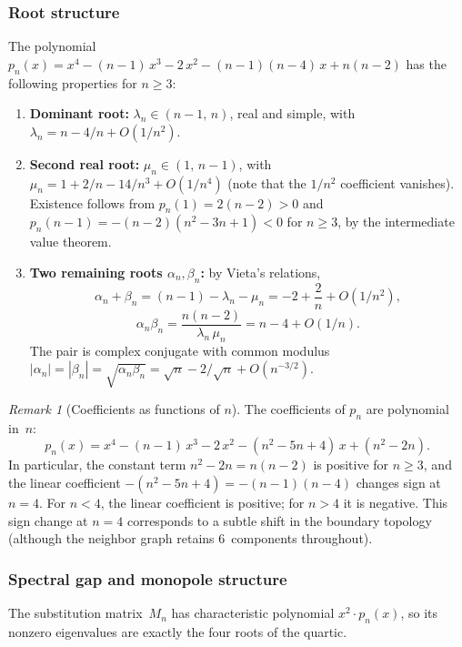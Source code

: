 \documentclass{amsart}
\theoremstyle{definition}
\theoremstyle{remark}
\newtheorem{remark}[theorem]{Remark}
\begin{document}
\subsubsection{Root structure}
\label{ssec:roots}

The polynomial $p_n(x) = x^4 - (n{-}1)\,x^3 - 2\,x^2 - (n{-}1)(n{-}4)\,x + n(n{-}2)$
has the following properties for $n \ge 3$:

\begin{enumerate}
\item \textbf{Dominant root:} $\lambda_n \in (n{-}1,\, n)$, real and simple,
with $\lambda_n = n - 4/n + O(1/n^2)$.
\item \textbf{Second real root:} $\mu_n \in (1,\, n{-}1)$, with
$\mu_n = 1 + 2/n - 14/n^3 + O(1/n^4)$ (note that the $1/n^2$
coefficient vanishes).  Existence follows from $p_n(1) = 2(n{-}2) > 0$
and $p_n(n{-}1) = -(n{-}2)(n^2{-}3n{+}1) < 0$ for $n \ge 3$, by the
intermediate value theorem.
\item \textbf{Two remaining roots $\alpha_n, \beta_n$:} by Vieta's
relations,
\[
  \alpha_n + \beta_n = (n{-}1) - \lambda_n - \mu_n
                     = -2 + \frac{2}{n} + O(1/n^2),
\]
\[
  \alpha_n \beta_n = \frac{n(n{-}2)}{\lambda_n\, \mu_n}
                   = n - 4 + O(1/n).
\]
The pair is complex conjugate with common modulus
$|\alpha_n| = |\beta_n| = \sqrt{\alpha_n \beta_n} = \sqrt{n} - 2/\sqrt{n} + O(n^{-3/2})$.
\end{enumerate}

\begin{remark}[Coefficients as functions of $n$]
The coefficients of $p_n$ are polynomial in~$n$:
\[
  p_n(x) = x^4 - (n{-}1)\,x^3 - 2\,x^2 - (n^2{-}5n{+}4)\,x + (n^2{-}2n).
\]
In particular, the constant term $n^2 - 2n = n(n{-}2)$ is positive for
$n \ge 3$, and the linear coefficient $-(n^2{-}5n{+}4) =
-(n{-}1)(n{-}4)$ changes sign at $n = 4$.  For $n < 4$, the linear
coefficient is positive; for $n > 4$ it is negative.  This sign change
at $n = 4$ corresponds to a subtle shift in the boundary topology
(although the neighbor graph retains $6$~components throughout).
\end{remark}

\subsubsection{Spectral gap and monopole structure}
\label{ssec:spectral}

The substitution matrix~$M_n$ has characteristic polynomial
$x^2 \cdot p_n(x)$, so its nonzero eigenvalues are exactly the
four roots of the quartic.
\end{document}
